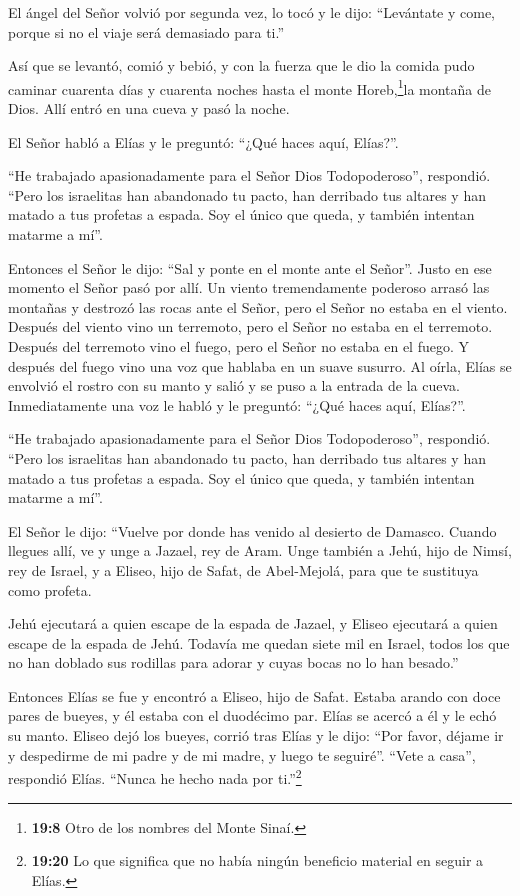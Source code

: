  El ángel del Señor volvió por segunda vez, lo tocó y le
dijo: ``Levántate y come, porque si no el viaje será demasiado para
ti.''

 Así que se levantó, comió y bebió, y con la fuerza que le
dio la comida pudo caminar cuarenta días y cuarenta noches hasta el
monte Horeb,\footnote{\textbf{19:8} Otro de los nombres del Monte Sinaí.}la
montaña de Dios.  Allí entró en una cueva y pasó la noche.

El Señor habló a Elías y le preguntó: ``¿Qué haces aquí, Elías?''.

 ``He trabajado apasionadamente para el Señor Dios
Todopoderoso'', respondió. ``Pero los israelitas han abandonado tu
pacto, han derribado tus altares y han matado a tus profetas a espada.
Soy el único que queda, y también intentan matarme a mí''.

 Entonces el Señor le dijo: ``Sal y ponte en el monte ante
el Señor''. Justo en ese momento el Señor pasó por allí. Un viento
tremendamente poderoso arrasó las montañas y destrozó las rocas ante el
Señor, pero el Señor no estaba en el viento. Después del viento vino un
terremoto, pero el Señor no estaba en el terremoto. 
Después del terremoto vino el fuego, pero el Señor no estaba en el
fuego. Y después del fuego vino una voz que hablaba en un suave susurro.
 Al oírla, Elías se envolvió el rostro con su manto y salió
y se puso a la entrada de la cueva. Inmediatamente una voz le habló y le
preguntó: ``¿Qué haces aquí, Elías?''.

 ``He trabajado apasionadamente para el Señor Dios
Todopoderoso'', respondió. ``Pero los israelitas han abandonado tu
pacto, han derribado tus altares y han matado a tus profetas a espada.
Soy el único que queda, y también intentan matarme a mí''.

 El Señor le dijo: ``Vuelve por donde has venido al
desierto de Damasco. Cuando llegues allí, ve y unge a Jazael, rey de
Aram.  Unge también a Jehú, hijo de Nimsí, rey de Israel, y
a Eliseo, hijo de Safat, de Abel-Mejolá, para que te sustituya como
profeta.

 Jehú ejecutará a quien escape de la espada de Jazael, y
Eliseo ejecutará a quien escape de la espada de Jehú. 
Todavía me quedan siete mil en Israel, todos los que no han doblado sus
rodillas para adorar y cuyas bocas no lo han besado.''

 Entonces Elías se fue y encontró a Eliseo, hijo de Safat.
Estaba arando con doce pares de bueyes, y él estaba con el duodécimo
par. Elías se acercó a él y le echó su manto.  Eliseo dejó
los bueyes, corrió tras Elías y le dijo: ``Por favor, déjame ir y
despedirme de mi padre y de mi madre, y luego te seguiré''. ``Vete a
casa'', respondió Elías. ``Nunca he hecho nada por ti.''\footnote{\textbf{19:20}
  Lo que significa que no había ningún beneficio material en seguir a
  Elías.}


